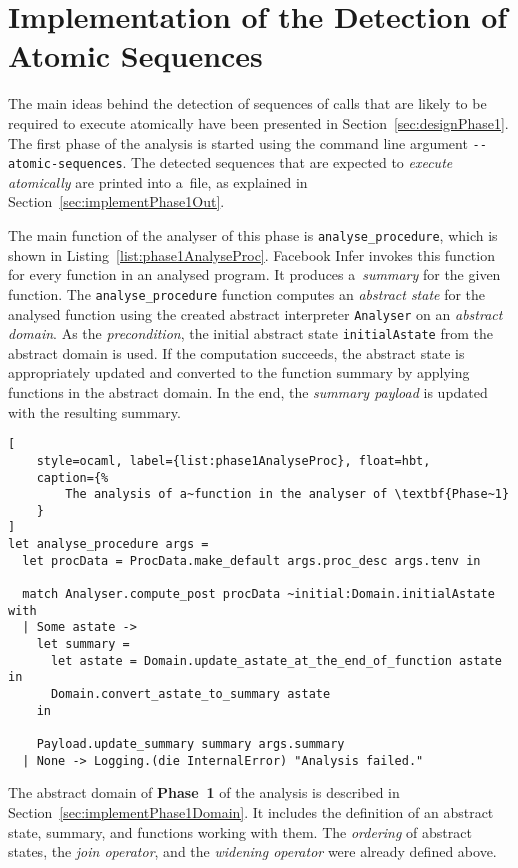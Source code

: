 \section{Implementation of the Detection of Atomic Sequences}
\label{sec:implementPhase1}

The main ideas behind the detection of sequences of calls that are 
likely to be required to execute atomically have been presented in
Section~\ref{sec:designPhase1}. The first phase of the analysis is 
started using the command line argument \texttt{{-}{-}atomic-sequences}. 
The detected sequences that are expected to \emph{execute atomically}
are printed into a~file, as explained in
Section~\ref{sec:implementPhase1Out}.

The main function of the analyser of this phase is
\texttt{analyse\_procedure}, which is shown in
Listing~\ref{list:phase1AnalyseProc}. Facebook Infer invokes
this function for every function in an analysed program. It produces
a~\emph{summary} for the given function. The \texttt{analyse\_procedure} 
function computes an \emph{abstract state} for the analysed function 
using the created abstract interpreter \texttt{Analyser} on an 
\emph{abstract domain}. As the \emph{precondition}, the initial 
abstract state \texttt{initialAstate} from the abstract domain is 
used. If the computation succeeds, the abstract state is appropriately 
updated and converted to the function summary by applying functions 
in the abstract domain. In the end, the \emph{summary payload} is 
updated with the resulting summary.

\begin{lstlisting}[
    style=ocaml, label={list:phase1AnalyseProc}, float=hbt,
    caption={%
        The analysis of a~function in the analyser of \textbf{Phase~1}
    }
]
let analyse_procedure args =
  let procData = ProcData.make_default args.proc_desc args.tenv in

  match Analyser.compute_post procData ~initial:Domain.initialAstate with
  | Some astate ->
    let summary =
      let astate = Domain.update_astate_at_the_end_of_function astate in
      Domain.convert_astate_to_summary astate
    in

    Payload.update_summary summary args.summary
  | None -> Logging.(die InternalError) "Analysis failed."
\end{lstlisting}

The abstract domain of \textbf{Phase~1} of the analysis is described in
Section~\ref{sec:implementPhase1Domain}. It includes the definition of
an abstract state, summary, and functions working with them.
The \emph{ordering} of abstract states, the \emph{join operator}, and
the \emph{widening operator} were already defined above.


